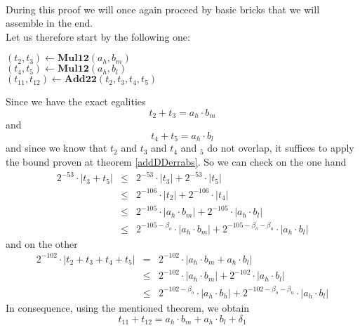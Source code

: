 \documentclass[a4paper,10pt,twoside]{article}
\newenvironment{proof}[1][Proof]{\begin{trivlist}
\item[\hskip \labelsep {\bfseries #1}]}{\end{trivlist}}
\newcommand{\hi}{\ensuremath{\mathit{h}}}
\newcommand{\mi}{\ensuremath{\mathit{m}}}
\newcommand{\lo}{\ensuremath{\mathit{l}}}
\newcommand{\mAddDD}{\ensuremath{\mathbf{Add22}}}
\newcommand{\mMul}{\ensuremath{\mathbf{Mul12}}}
\begin{document}
\begin{proof} ~ \\
During this proof we will once again proceed by basic bricks that we will assemble in the end.\\
Let us therefore start by the following one:
\begin{center}
\begin{minipage}[b]{60mm}
$\left( t_2, t_3 \right) \gets \mMul\left( a_\hi, b_\mi \right)$ \\
$\left( t_4, t_5 \right) \gets \mMul\left( a_\hi, b_\lo \right)$ \\
$\left( t_{11}, t_{12} \right) \gets \mAddDD\left( t_2, t_3, t_4, t_5 \right)$
\end{minipage}
\end{center}
Since we have the exact egalities
$$t_2 + t_3 = a_\hi \cdot b_\mi$$
and
$$t_4 + t_5 = a_\hi \cdot b_\lo$$
and since we know that $t_2$ and $t_3$ and $t_4$ and $_5$ do not overlap, 
it suffices to apply the bound proven at theorem \ref{addDDerrabs}. 
So we can check on the one hand
\begin{eqnarray*}
2^{-53} \cdot \left \vert t_3 + t_5 \right \vert & \leq & 2^{-53} \cdot \left \vert t_3 \right \vert + 2^{-53} \cdot \left \vert t_5 \right \vert \\
& \leq & 2^{-106} \cdot \left \vert t_2 \right \vert + 2^{-106} \cdot \left \vert t_4 \right \vert \\
& \leq & 2^{-105} \cdot \left \vert a_\hi \cdot b_\mi \right \vert + 2^{-105} \cdot \left \vert a_\hi \cdot b_\lo \right \vert \\
& \leq & 2^{-105-\beta_o} \cdot \left \vert a_\hi \cdot b_\mi \right \vert + 2^{-105-\beta_o-\beta_u} \cdot \left \vert a_\hi \cdot b_\lo \right \vert
\end{eqnarray*}
and on the other
\begin{eqnarray*}
2^{-102} \cdot \left \vert t_2 + t_3 + t_4 + t_5 \right \vert & = & 
2^{-102} \cdot \left \vert a_\hi \cdot b_\mi + a_\hi \cdot b_\lo \right \vert \\
& \leq & 2^{-102} \cdot \left \vert a_\hi \cdot b_\mi \right \vert + 2^{-102} \cdot \left \vert a_\hi \cdot b_\lo \right \vert \\
& \leq & 2^{-102-\beta_o} \cdot \left \vert a_\hi \cdot b_\hi \right \vert + 2^{-102-\beta_o-\beta_u} \cdot \left \vert a_\hi \cdot b_\lo \right \vert
\end{eqnarray*}
In consequence, using the mentioned theorem, we obtain
$$t_{11} + t_{12} = a_\hi \cdot b_\mi + a_\hi \cdot b_\lo + \delta_1$$

\end{proof}
\end{document}
